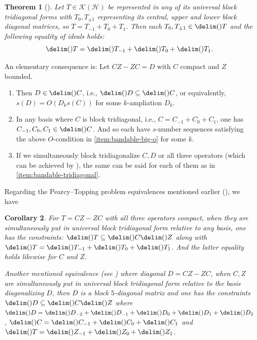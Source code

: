 \documentclass[10pt,reqno]{amsart}
\newtheorem{theorem}{Theorem}[section]
\newtheorem{corollary}[theorem]{Corollary}
\theoremstyle{remark}
\newcommand{\KH}{\mathcal{K}(\Hil)}
\newcommand{\Hil}{\mathcal{H}}
\newcommand{\ideal}{\delim()}
\numberwithin{equation}{section}
\begin{document}
\begin{theorem}[]
  \label{thm:bandable}
  Let $T \in \KH$ be represented in any of its universal block tridiagonal forms with $T_0, T_{\pm 1}$ representing its central, upper and lower block diagonal matrices, so $T = T_{-1}+T_0+T_1$.
  Then each $T_0, T_{\pm 1} \in \ideal{T}$ and the following equality of ideals holds:
  \begin{equation*}
    \ideal{T} = \ideal{T_{-1}}+\ideal{T_0}+\ideal{T_1}.
  \end{equation*}
\end{theorem}

An elementary consequence is: Let $CZ - ZC = D$ with $C$ compact and $Z$ bounded.
\begin{enumerate}
\item \label{item:bandable-big-o} Then $D \in \ideal{C}$, i.e., $\ideal{D} \subseteq \ideal{C}$, or equivalently, $s(D) = O(D_ks(C))$ for some $k$-ampliation $D_k$.
\item \label{item:bandable-tridiagonal} In any basis where $C$ is block tridiagonal, i.e., $C = C_{-1} + C_0 + C_1$, one has $C_{-1}, C_0, C_1 \in \ideal{C}$.
  And so each have $s$-number sequences satisfying the above $O$-condition in \ref{item:bandable-big-o} for some $k$.
\item If we simultaneously block tridiagonalize $C, D$ or all three operators (which can be achieved by ), the same can be said for  each of them as in \ref{item:bandable-tridiagonal}.
\end{enumerate}

Regarding the Pearcy--Topping problem equivalences mentioned earlier (), we have
\begin{corollary}
  \label{blockdiag corollary}
  For $T = CZ-ZC$ with all three operators compact, when they are simultaneously put in universal block tridiagonal form relative to any basis, one has the constraints: $\ideal{T} \subseteq \ideal{C}\ideal{Z}$ along with $\ideal{T} = \ideal{T_{-1}}+\ideal{T_0}+\ideal{T_1}$.
  And the latter equality holds likewise for $C$ and $Z$.

  Another mentioned equivalence (see ) where diagonal $D = CZ-ZC$, when $C,Z$ are simultaneously put in universal block tridiagonal form relative to the basis diagonalizing $D$, then $D$ is a block $5$-diagonal matrix and one has the constraints $\ideal{D} \subseteq \ideal{C}\ideal{Z}$ where $\ideal{D} = \ideal{D_{-2}} + \ideal{D_{-1}}+\ideal{D_0}+\ideal{D_1} + \ideal{D_2}$, $\ideal{C} = \ideal{C_{-1}}+\ideal{C_0}+\ideal{C_1}$ and $\ideal{T} = \ideal{Z_{-1}}+\ideal{Z_0}+\ideal{Z_1}$.
\end{corollary}
\end{document}
